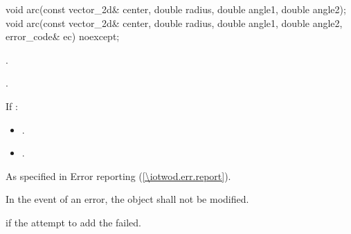 \begin{itemdecl}
    void arc(const vector_2d& center, double radius, double angle1,
      double angle2);
    void arc(const vector_2d& center, double radius, double angle1,
      double angle2, error_code& ec) noexcept;
\end{itemdecl}
\begin{itemdescr}
	\pnum
	\effects
	.
	
	\pnum
	.
	
	\pnum
	If :
	\begin{itemize}
	\item {}.
	
	\item {}.
	\end{itemize}
	
	\pnum
	\throws
	As specified in Error reporting (\ref{\iotwod.err.report}).

	\pnum
	\remarks
	In the event of an error, the object shall not be modified.

	\pnum
	\errors
	 if the attempt to add the  failed.
	
\end{itemdescr}

